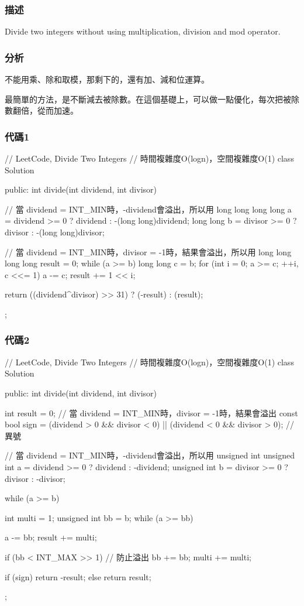 \subsubsection{描述}
Divide two integers without using multiplication, division and mod operator.


\subsubsection{分析}
不能用乘、除和取模，那剩下的，還有加、減和位運算。

最簡單的方法，是不斷減去被除數。在這個基礎上，可以做一點優化，每次把被除數翻倍，從而加速。


\subsubsection{代碼1}
\begin{Code}
// LeetCode, Divide Two Integers
// 時間複雜度O(logn)，空間複雜度O(1)
class Solution {
public:
    int divide(int dividend, int divisor) {
        // 當 dividend = INT_MIN時，-dividend會溢出，所以用 long long
        long long a = dividend >= 0 ? dividend : -(long long)dividend;
        long long b = divisor >= 0 ? divisor : -(long long)divisor;

        // 當 dividend = INT_MIN時，divisor = -1時，結果會溢出，所以用 long long
        long long result = 0;
        while (a >= b) {
            long long c = b;
            for (int i = 0; a >= c; ++i, c <<= 1) {
                a -= c;
                result += 1 << i;
            }
        }

        return ((dividend^divisor) >> 31) ? (-result) : (result);
    }
};
\end{Code}


\subsubsection{代碼2}
\begin{Code}
// LeetCode, Divide Two Integers
// 時間複雜度O(logn)，空間複雜度O(1)
class Solution {
public:
    int divide(int dividend, int divisor) {
        int result = 0; // 當 dividend = INT_MIN時，divisor = -1時，結果會溢出
        const bool sign = (dividend > 0 && divisor < 0) ||
                (dividend < 0 && divisor > 0); // 異號

        // 當 dividend = INT_MIN時，-dividend會溢出，所以用 unsigned int
        unsigned int a = dividend >= 0 ? dividend : -dividend;
        unsigned int b = divisor >= 0 ? divisor : -divisor;

        while (a >= b) {
            int multi = 1;
            unsigned int bb = b;
            while (a >= bb) {
                a -= bb;
                result += multi;

                if (bb < INT_MAX >> 1) { // 防止溢出
                    bb += bb;
                    multi += multi;
                }
            }
        }
        if (sign) return -result;
        else return result;
    }
};
\end{Code}


